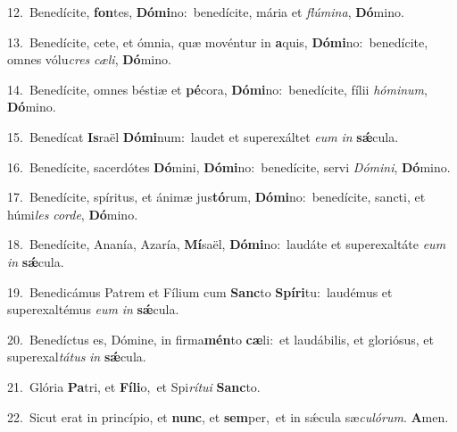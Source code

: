 {\numbfont\textcolor{\numbcolor}{12.}}~Benedícite, \textbf{fon}\-tes, \textbf{Dó}\-\textbf{mi}no:~\star benedícite, mária et \textit{flú}\-\textit{mi}\textit{na}, \textbf{Dó}\-mino.\par
{\numbfont\textcolor{\numbcolor}{13.}}~Benedícite, cete, et ómnia, quæ movéntur in \textbf{a}\-quis, \textbf{Dó}\-\textbf{mi}no:~\star benedícite, omnes vólu\textit{cres} \textit{cæ}\-\textit{li}, \textbf{Dó}\-mino.\par
{\numbfont\textcolor{\numbcolor}{14.}}~Benedícite, omnes béstiæ et \textbf{pé}\-cora, \textbf{Dó}\-\textbf{mi}no:~\star benedícite, fílii \textit{hó}\-\textit{mi}\textit{num}, \textbf{Dó}\-mino.\par
{\numbfont\textcolor{\numbcolor}{15.}}~Benedícat \textbf{Is}\-raël \textbf{Dó}\-\textbf{mi}num:~\star laudet et superexáltet \textit{e}\-\textit{um} \textit{in} \textbf{sǽ}\-cula.\par
{\numbfont\textcolor{\numbcolor}{16.}}~Benedícite, sacerdótes \textbf{Dó}\-mini, \textbf{Dó}\-\textbf{mi}no:~\star benedícite, servi \textit{Dó}\-\textit{mi}\textit{ni}, \textbf{Dó}\-mino.\par
{\numbfont\textcolor{\numbcolor}{17.}}~Benedícite, spíritus, et ánimæ jus\-\textbf{tó}\-rum, \textbf{Dó}\-\textbf{mi}no:~\star benedícite, sancti, et húmi\textit{les} \textit{cor}\-\textit{de}, \textbf{Dó}\-mino.\par
{\numbfont\textcolor{\numbcolor}{18.}}~Benedícite, Ananía, Azaría, \textbf{Mí}\-saël, \textbf{Dó}\-\textbf{mi}no:~\star laudáte et superexaltáte \textit{e}\-\textit{um} \textit{in} \textbf{sǽ}\-cula.\par
{\numbfont\textcolor{\numbcolor}{19.}}~Benedicámus Patrem et Fílium cum \textbf{Sanc}\-to \textbf{Spí}\-\textbf{ri}tu:~\star laudémus et superexaltémus \textit{e}\-\textit{um} \textit{in} \textbf{sǽ}\-cula.\par
{\numbfont\textcolor{\numbcolor}{20.}}~Benedíctus es, Dómine, in firma\-\textbf{mén}\-to \textbf{cæ}\-li:~\star et laudábilis, et gloriósus, et superexal\-\textit{tá}\-\textit{tus} \textit{in} \textbf{sǽ}\-cula.\par
{\numbfont\textcolor{\numbcolor}{21.}}~Glória \textbf{Pa}\-tri, et \textbf{Fí}\-\textbf{li}o,~\star et Spi\-\textit{rí}\-\textit{tu}\textit{i} \textbf{Sanc}\-to.\par
{\numbfont\textcolor{\numbcolor}{22.}}~Sicut erat in princípio, et \textbf{nunc}\-, et \textbf{sem}\-per,~\star et in sǽcula sæ\-\textit{cu}\-\textit{ló}\textit{rum}. \textbf{A}\-men.\par
